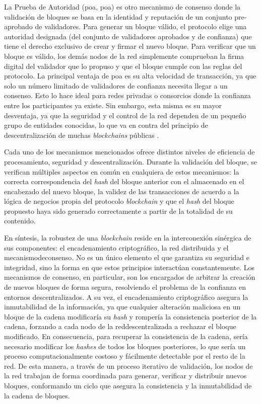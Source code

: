 La Prueba de Autoridad (\acrshort{poa}, \acrlong{poa}) es otro mecanismo de consenso donde la validación de bloques se basa en la identidad y reputación de un conjunto pre-aprobado de validadores. Para generar un bloque válido, el protocolo elige una autoridad designada (del conjunto de validadores aprobados y de confianza) que tiene el derecho exclusivo de crear y firmar el nuevo bloque. Para verificar que un bloque es válido, los demás nodos de la red simplemente comprueban la firma digital del validador que lo propuso y que el bloque cumple con las reglas del protocolo. La principal ventaja de \acrshort{poa} es su alta velocidad de transacción, ya que solo un número limitado de validadores de confianza necesita llegar a un consenso. Esto lo hace ideal para redes privadas o consorcios donde la confianza entre los participantes ya existe. Sin embargo, esta misma es su mayor desventaja, ya que la seguridad y el control de la red dependen de un pequeño grupo de entidades conocidas, lo que va en contra del principio de descentralización de muchas \textit{blockchains} públicas \cite{diaz2022protocolos}.

Cada uno de los mecanismos mencionados ofrece distintos niveles de eficiencia de procesamiento, seguridad y descentralización. Durante la validación del bloque, se verifican múltiples aspectos en común en cualquiera de estos mecanismos: la correcta correspondencia del \textit{hash} del bloque anterior con el almacenado en el encabezado del nuevo bloque, la validez de las transacciones de acuerdo a la lógica de negocios propia del protocolo \textit{blockchain} y que el \textit{hash} del bloque propuesto haya sido generado correctamente a partir de la totalidad de su contenido.

En síntesis, la robustez de una \textit{blockchain} reside en la interconexión sinérgica de sus componentes: el encadenamiento criptográfico, la red distribuida y el \gls{mecanismodeconsenso}. No es un único elemento el que garantiza su seguridad e integridad, sino la forma en que estos principios interactúan constantemente. Los mecanismos de consenso, en particular, son los encargados de arbitrar la creación de nuevos bloques de forma segura, resolviendo el problema de la confianza en entornos descentralizados. A su vez, el encadenamiento criptográfico asegura la inmutabilidad de la información, ya que cualquier alteración maliciosa en un bloque de la cadena modificaría su \textit{hash} y rompería la consistencia posterior de la cadena, forzando a cada nodo de la \gls{reddescentralizada} a rechazar el bloque modificado. En consecuencia, para recuperar la consistencia de la cadena, sería necesario modificar los \textit{hashes} de todos los bloques posteriores, lo que sería un proceso computacionalmente costoso y fácilmente detectable por el resto de la red. De esta manera, a través de un proceso iterativo de validación, los \glspl{nodo} de la red trabajan de forma coordinada para generar, verificar y distribuir nuevos bloques, conformando un ciclo que asegura la consistencia y la inmutabilidad de la cadena de bloques.

